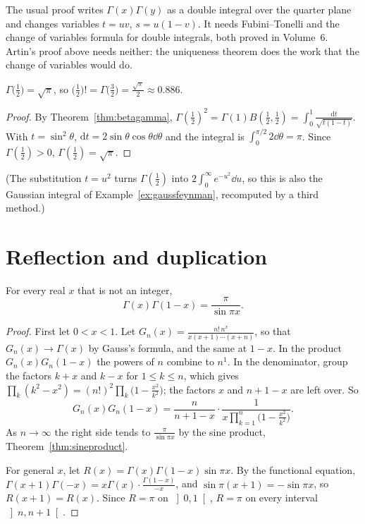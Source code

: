 \begin{remark}
The usual proof writes $\Gamma(x)\Gamma(y)$ as a double integral over the quarter plane and changes variables $t=uv$, $s=u(1-v)$.
It needs Fubini--Tonelli and the change of variables formula for double integrals, both proved in Volume~6. Artin's proof
above needs neither: the uniqueness theorem does the work that the change of variables would do.
\end{remark}

\begin{proposition}\label{prop:gammahalf}
$\Gamma\bigl(\frac12\bigr)=\sqrt\pi$, so $\bigl(\frac12\bigr)!=\Gamma\bigl(\frac32\bigr)=\frac{\sqrt\pi}2\approx0.886$.
\end{proposition}
\begin{proof}
By Theorem~\ref{thm:betagamma}, $\Gamma(\frac12)^2=\Gamma(1)B(\frac12,\frac12)=\int_0^1\frac{\mathrm dt}{\sqrt{t(1-t)}}$. With $t=\sin^2\theta$,
$\mathrm dt=2\sin\theta\cos\theta\dd\theta$ and the integral is $\int_0^{\pi/2}2\dd\theta=\pi$. Since $\Gamma(\frac12)>0$, $\Gamma(\frac12)=\sqrt\pi$.
\end{proof}

(The substitution $t=u^2$ turns $\Gamma(\frac12)$ into $2\int_0^\infty e^{-u^2}\dd u$, so this is also the Gaussian integral of
Example~\ref{ex:gaussfeynman}, recomputed by a third method.)

\section{Reflection and duplication}

\begin{theorem}\label{thm:reflection}
For every real $x$ that is not an integer,
\[
\Gamma(x)\Gamma(1-x)=\frac\pi{\sin\pi x}.
\]
\end{theorem}
\begin{proof}
First let $0<x<1$. Let $G_n(x)=\frac{n!\,n^x}{x(x+1)\cdots(x+n)}$, so that $G_n(x)\to\Gamma(x)$ by Gauss's formula, and the same at $1-x$.
In the product $G_n(x)G_n(1-x)$ the powers of $n$ combine to $n^1$. In the denominator, group the factors $k+x$ and $k-x$ for
$1\le k\le n$, which gives $\prod_k(k^2-x^2)=(n!)^2\prod_k\bigl(1-\frac{x^2}{k^2}\bigr)$; the factors $x$ and $n+1-x$ are left over. So
\[
G_n(x)G_n(1-x)=\frac n{n+1-x}\cdot\frac1{x\prod_{k=1}^n\bigl(1-\frac{x^2}{k^2}\bigr)}.
\]
As $n\to\infty$ the right side tends to $\frac\pi{\sin\pi x}$ by the sine product, Theorem~\ref{thm:sineproduct}.

For general $x$, let $R(x)=\Gamma(x)\Gamma(1-x)\sin\pi x$. By the functional equation,
$\Gamma(x+1)\Gamma(-x)=x\Gamma(x)\cdot\frac{\Gamma(1-x)}{-x}$, and $\sin\pi(x+1)=-\sin\pi x$, so $R(x+1)=R(x)$. Since $R=\pi$ on $\left]0,1\right[$,
$R=\pi$ on every interval $\left]n,n+1\right[$.
\end{proof}

